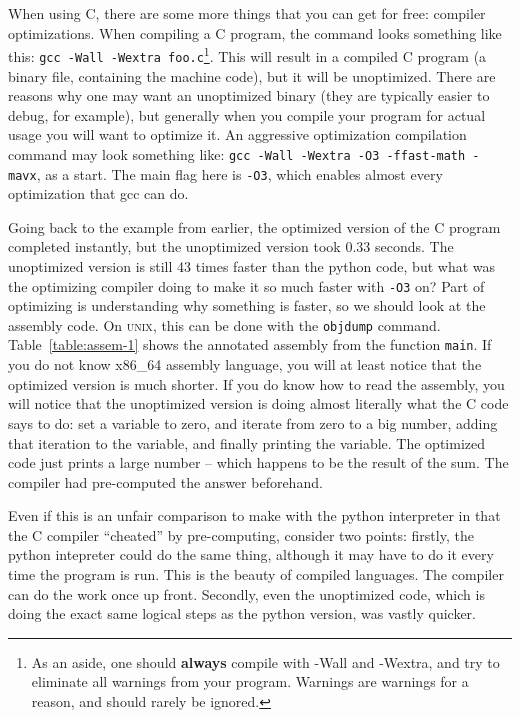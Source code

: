 When using C, there are some more things that you can get for free: compiler optimizations. When
compiling a C program, the command looks something like this: \texttt{gcc -Wall -Wextra foo.c}\footnote{As an aside, one should \textbf{always} compile with -Wall and -Wextra, and try to eliminate all warnings from your program.
Warnings are warnings for a reason, and should rarely be ignored.}. This will
result in a compiled C program (a binary file, containing the machine code), but it will be
unoptimized. There are reasons why one may want an unoptimized binary (they are typically
easier to debug, for example), but generally when you compile your program for actual usage
you will want to optimize it. An aggressive optimization compilation command may look something
like: \texttt{gcc -Wall -Wextra -O3 -ffast-math -mavx}, as a start. The main flag here is \texttt{-O3}, which
enables almost every optimization that gcc can do.

Going back to the example from earlier, the optimized version of the C program completed instantly, but
the unoptimized version took 0.33 seconds. The unoptimized version is still 43 times faster than the
python code, but what was the optimizing compiler doing to make it so much faster with \texttt{-O3} on?
Part of optimizing is understanding why something is faster, so we should look at the assembly code. On \textsc{unix},
this can be done with the \texttt{objdump} command. Table~\ref{table:assem-1} shows the annotated assembly from
the function \texttt{main}. If you do not know x86\_64 assembly language, you will at least notice that the
optimized version is much shorter. If you do know how to read the assembly, you will notice that the unoptimized
version is doing almost literally what the C code says to do: set a variable to zero, and iterate from zero to
a big number, adding that iteration to the variable, and finally printing the variable. The optimized code just prints a large number -- which happens to be the result of the sum.
The compiler had pre-computed the answer beforehand.

Even if this is an unfair comparison to make with the python interpreter in that the C compiler
``cheated'' by pre-computing, consider two points: firstly, the python intepreter could do the
same thing, although it may have to do it every time the program is run. This is the beauty
of compiled languages. The compiler can do the work once up front. Secondly, even the unoptimized
code, which is doing the exact same logical steps as the python version, was vastly quicker.

